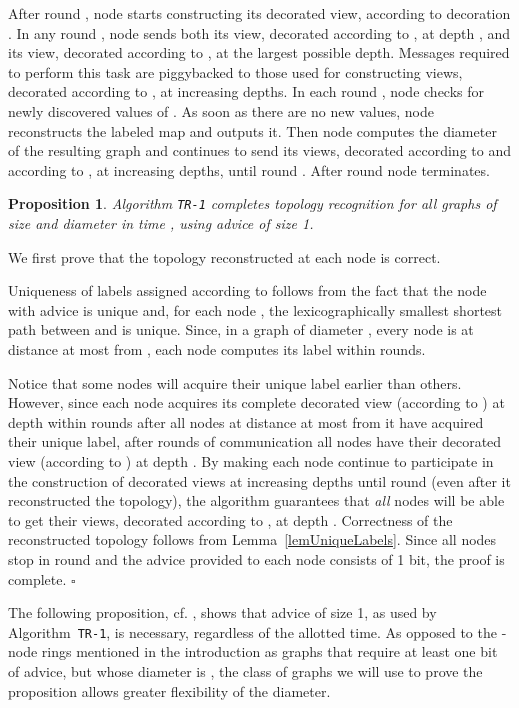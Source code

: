 \documentclass{article}
\newcommand*{\qed}{\hfill\ensuremath{\square}}
\newtheorem{proposition}{Proposition}[section]
\newenvironment{proof}{\noindent{\bf Proof:}}{\qed}
\newcommand{\procend}{\hfill \medskip}
\begin{document}
After round , node  starts constructing its decorated view, according to decoration . 
In any round , node  sends both its view, decorated according to , at depth , and its view, decorated according to , at the largest possible depth. Messages required to perform this task are piggybacked to those used for constructing views, decorated according to , at increasing depths.
In each round , node  checks for newly discovered values of .
As soon as there are no new values, node  reconstructs the labeled map and outputs it.
Then node  computes the diameter  of the resulting graph and continues to send its views, decorated according to  and according to  , at increasing depths, until round .  After round  node  terminates.
\procend


\begin{proposition}\label{ubTime2D+1}
Algorithm {\tt TR-1} completes topology recognition for all graphs of size  and diameter  in time , using advice of size 1.
\end{proposition}
\begin{proof}
We first prove that the topology reconstructed at each node is correct.

Uniqueness of labels assigned according to    follows from the fact that  the node  with advice  is unique and, for each node ,
the lexicographically smallest shortest path between  and  is unique.
Since, in a graph of diameter , every node is at distance at most  from , each node  computes its label  within  rounds.

Notice that some nodes will acquire their unique label earlier than others. However, since each node acquires its complete decorated view (according to ) at depth  within  rounds after all nodes at distance at most  from it have acquired their unique label, after  rounds of communication all nodes have their decorated view (according to ) at depth .
By making each node continue to participate in the construction of decorated views at increasing depths until round  (even after it reconstructed the topology), the algorithm guarantees that {\em all} nodes will be able to get their views, decorated according to , at depth . Correctness of the reconstructed topology follows from Lemma~\ref{lemUniqueLabels}. Since all nodes stop in round  and the advice provided to each node consists of 1 bit, the proof is complete.
\end{proof}

The following proposition, cf. \cite{YK3}, shows that advice of size 1, as used by Algorithm~{\tt TR-1}, is necessary, regardless of the allotted time.
As opposed to the -node rings mentioned in the introduction as graphs that require at least one bit of advice, but whose diameter is , the class of graphs we will use to prove the proposition allows greater flexibility of the diameter.
\end{document}

